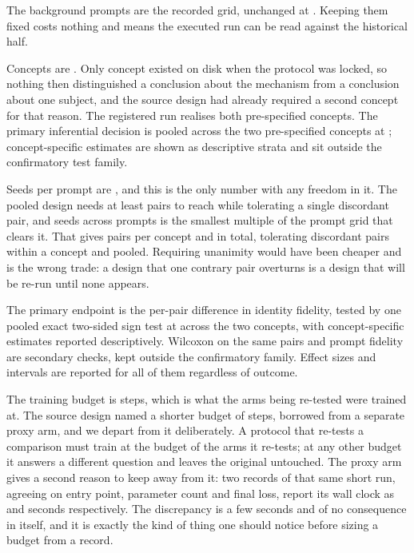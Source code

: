 The background prompts are the recorded grid, unchanged at \NPairs{}. Keeping
them fixed costs nothing and means the executed run can be read against the
historical half.

Concepts are \DesignConcepts{}. Only \NConceptsRun{} concept existed on disk
when the protocol was locked, so nothing then distinguished a conclusion about
the mechanism from a conclusion about one subject, and the source design had
already required a second concept for that reason. The registered run
realises both pre-specified concepts. The primary inferential decision is
pooled across the two pre-specified concepts at \Alpha{}; concept-specific
estimates are shown as descriptive strata and sit outside the confirmatory
test family.

Seeds per prompt are \DesignSeeds{}, and this is the only number with any
freedom in it. The pooled design needs at least \MinNOne{} pairs to reach
\Alpha{} while tolerating a single discordant pair, and \DesignSeeds{} seeds
across \NPairs{} prompts is the smallest multiple of the prompt grid that clears
it. That gives \DesignPerConcept{} pairs per concept and \DesignTotal{} in
total, tolerating \DesignTolerance{} discordant pairs within a concept and
\DesignPooledTolerance{} pooled. Requiring unanimity would have been cheaper
and is the wrong trade: a design that one contrary pair overturns is a design
that will be re-run until none appears.

The primary endpoint is the per-pair difference in identity fidelity, tested by
one pooled exact two-sided sign test at \Alpha{} across the two concepts, with
concept-specific estimates reported descriptively. Wilcoxon on the same pairs
and prompt fidelity are secondary checks, kept outside the confirmatory
family. Effect sizes and intervals are reported for all of them regardless of
outcome.

The training budget is \TrainSteps{} steps, which is what the arms being
re-tested were trained at. The source design named a shorter budget of
\ProxySteps{} steps, borrowed from a separate proxy arm, and we depart from it
deliberately. A protocol that re-tests a comparison must train at the budget of
the arms it re-tests; at any other budget it answers a different question and
leaves the original untouched. The proxy arm gives a second reason to keep
away from it: two records of that same short run, agreeing on entry point,
parameter count and final loss, report its wall clock as \ProxyWallRun{} and
\ProxyWallCloseout{} seconds respectively. The discrepancy is a few seconds
and of no consequence in itself, and it is exactly the kind of thing one
should notice before sizing a budget from a record.

